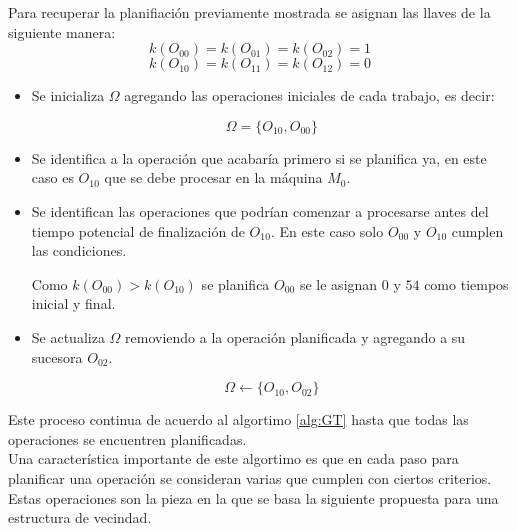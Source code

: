 Para recuperar la planifiación previamente mostrada se asignan las llaves de la siguiente manera: \[k(O_{00})=k(O_{01})=k(O_{02})=1\]  \[k(O_{10})=k(O_{11})=k(O_{12})=0\]
\begin{itemize}
    \item Se inicializa $\Omega$ agregando las operaciones iniciales de cada trabajo, es decir:

\[\Omega = \{O_{10},O_{00}\}\]

     \item Se identifica a la operación que acabaría primero si se planifica ya, en este caso es $O_{10}$ que se debe procesar en la máquina $M_0$. 

     \item Se identifican las operaciones que podrían comenzar a procesarse antes del tiempo potencial de finalización de $O_{10}$. En este caso solo $O_{00}$ y  $O_{10}$ cumplen las condiciones.

Como $k(O_{00})>k(O_{10})$ se planifica $O_{00}$ se le asignan $0$ y $54$ como tiempos inicial y final.

     \item Se actualiza $\Omega$ removiendo a la operación planificada y agregando a su sucesora $O_{02}$.

\[\Omega\leftarrow \{O_{10},O_{02}\}\]
\end{itemize}
Este proceso continua de acuerdo al algortimo \ref{alg:GT} hasta que todas las operaciones se encuentren planificadas.\\

Una característica importante de este algortimo es que en cada paso para planificar una operación se consideran varias que cumplen con ciertos criterios. Estas operaciones son la pieza en la que se basa la siguiente propuesta para una estructura de vecindad.


